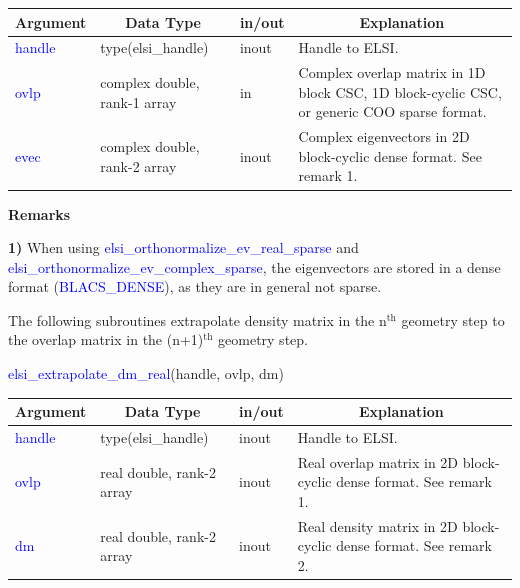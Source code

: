 \documentclass{report}
\begin{document}
\begin{tabular}[]{|p{20mm}|p{45mm}|p{15mm}|p{85mm}|}
\hline
\multicolumn{1}{|c|}{\textbf{Argument}} & \multicolumn{1}{c|}{\textbf{Data Type}} & \multicolumn{1}{c|}{\textbf{in/out}} & \multicolumn{1}{c|}{\textbf{Explanation}}\\
\hline
\textcolor{blue}{handle} & type(elsi\_handle)           & inout & Handle to ELSI.\\
\hline
\textcolor{blue}{ovlp}   & complex double, rank-1 array & in    & Complex overlap matrix in 1D block CSC, 1D block-cyclic CSC, or generic COO sparse format.\\
\hline
\textcolor{blue}{evec}   & complex double, rank-2 array & inout & Complex eigenvectors in 2D block-cyclic dense format. See remark 1.\\
\hline
\end{tabular}

\textbf{Remarks}

\textbf{1)} When using \textcolor{blue}{elsi\_orthonormalize\_ev\_real\_sparse} and \textcolor{blue}{elsi\_orthonormalize\_ev\_complex\_sparse}, the eigenvectors are stored in a dense format (\textcolor{blue}{BLACS\_DENSE}), as they are in general not sparse.

The following subroutines extrapolate density matrix in the n$^\text{th}$ geometry step to the overlap matrix in the (n+1)$^\text{th}$ geometry step.

\begin{labeling}{\hspace{6cm}}
\item [\hspace{0.3cm} \textcolor{blue}{elsi\_extrapolate\_dm\_real}(handle, ovlp, dm)]
\end{labeling}

\begin{tabular}[]{|p{20mm}|p{45mm}|p{15mm}|p{85mm}|}
\hline
\multicolumn{1}{|c|}{\textbf{Argument}} & \multicolumn{1}{c|}{\textbf{Data Type}} & \multicolumn{1}{c|}{\textbf{in/out}} & \multicolumn{1}{c|}{\textbf{Explanation}}\\
\hline
\textcolor{blue}{handle} & type(elsi\_handle)        & inout & Handle to ELSI.\\
\hline
\textcolor{blue}{ovlp}   & real double, rank-2 array & inout & Real overlap matrix in 2D block-cyclic dense format. See remark 1.\\
\hline
\textcolor{blue}{dm}     & real double, rank-2 array & inout & Real density matrix in 2D block-cyclic dense format. See remark 2.\\
\hline
\end{tabular}
\end{document}
